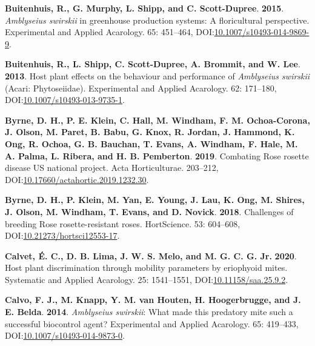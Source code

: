 \documentclass[12pt,final,CPage]{ufthesis}
\newlength{\cslhangindent}
\newenvironment{CSLReferences}[2] %
{%
	\setlength{\parindent}{0pt}
	\ifodd #1 \everypar{\setlength{\hangindent}{\cslhangindent}}\ignorespaces\fi
	\ifnum #2 > 0
	\setlength{\parskip}{#2\baselineskip}
	\fi
}%
{}
\begin{document}
{\begin{CSLReferences}{1}{0}
  \leavevmode{}%
  \textbf{Buitenhuis, R., G. Murphy, L. Shipp, and C. Scott-Dupree}. \textbf{2015}. {\emph{Amblyseius swirskii}} in greenhouse production systems: A floricultural perspective. Experimental and Applied Acarology. 65: 451--464, DOI:\href{https://doi.org/10.1007/s10493-014-9869-9}{10.1007/s10493-014-9869-9}.

  \leavevmode{}%
  \textbf{Buitenhuis, R., L. Shipp, C. Scott-Dupree, A. Brommit, and W. Lee}. \textbf{2013}. Host plant effects on the behaviour and performance of {\emph{Amblyseius swirskii}} ({Acari}: {Phytoseiidae}). Experimental and Applied Acarology. 62: 171--180, DOI:\href{https://doi.org/10.1007/s10493-013-9735-1}{10.1007/s10493-013-9735-1}.

  \leavevmode{}%
  \textbf{Byrne, D. H., P. E. Klein, C. Hall, M. Windham, F. M. Ochoa-Corona, J. Olson, M. Paret, B. Babu, G. Knox, R. Jordan, J. Hammond, K. Ong, R. Ochoa, G. B. Bauchan, T. Evans, A. Windham, F. Hale, M. A. Palma, L. Ribera, and H. B. Pemberton}. \textbf{2019}. Combating {Rose rosette disease} {US} national project. Acta Horticulturae. 203--212, DOI:\href{https://doi.org/10.17660/actahortic.2019.1232.30}{10.17660/actahortic.2019.1232.30}.

  \leavevmode{}%
  \textbf{Byrne, D. H., P. Klein, M. Yan, E. Young, J. Lau, K. Ong, M. Shires, J. Olson, M. Windham, T. Evans, and D. Novick}. \textbf{2018}. Challenges of breeding {Rose rosette}-resistant roses. {HortScience}. 53: 604--608, DOI:\href{https://doi.org/10.21273/hortsci12553-17}{10.21273/hortsci12553-17}.

  \leavevmode{}%
  \textbf{Calvet, É. C., D. B. Lima, J. W. S. Melo, and M. G. C. G. Jr.} \textbf{2020}. Host plant discrimination through mobility parameters by eriophyoid mites. Systematic and Applied Acarology. 25: 1541--1551, DOI:\href{https://doi.org/10.11158/saa.25.9.2}{10.11158/saa.25.9.2}.

  \leavevmode{}%
  \textbf{Calvo, F. J., M. Knapp, Y. M. van Houten, H. Hoogerbrugge, and J. E. Belda}. \textbf{2014}. {\emph{Amblyseius swirskii}}: What made this predatory mite such a successful biocontrol agent? Experimental and Applied Acarology. 65: 419--433, DOI:\href{https://doi.org/10.1007/s10493-014-9873-0}{10.1007/s10493-014-9873-0}.


\end{CSLReferences}}
\end{document}
